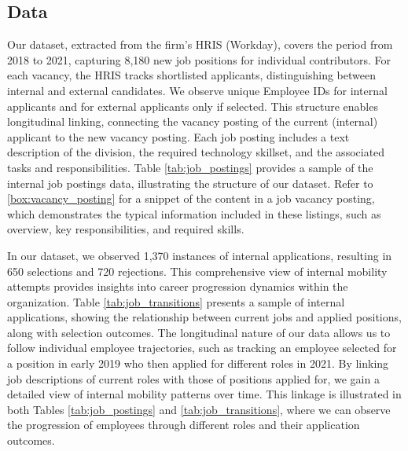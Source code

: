 \subsection{Data}

Our dataset, extracted from the firm's HRIS (Workday), covers the period from 2018 to 2021, capturing 8,180 new job 
positions for individual contributors. For each vacancy, the HRIS tracks shortlisted applicants, distinguishing 
between internal and external candidates. We observe unique Employee IDs for internal applicants and for external 
applicants only if selected. This structure enables longitudinal linking, connecting the vacancy posting of the 
current (internal) applicant to the new vacancy posting. Each job posting includes a text description of the 
division, the required technology skillset, and the associated tasks and responsibilities. 
Table \ref{tab:job_postings} provides a sample of the internal job postings data, illustrating the 
structure of our dataset. Refer to \ref{box:vacancy_posting} for a snippet of the content in a job 
vacancy posting, which demonstrates the typical information included in these listings, such as 
overview, key responsibilities, and required skills.

In our dataset, we observed 1,370 instances of internal applications, resulting in 650 selections and 720 rejections. 
This comprehensive view of internal mobility attempts provides insights into career progression dynamics within 
the organization. Table \ref{tab:job_transitions} presents a sample of internal applications, showing the 
relationship between current jobs and applied positions, along with selection outcomes. The longitudinal 
nature of our data allows us to follow individual employee trajectories, such as tracking an employee selected 
for a position in early 2019 who then applied for different roles in 2021. By linking job descriptions of 
current roles with those of positions applied for, we gain a detailed view of internal mobility patterns over 
time. This linkage is illustrated in both Tables \ref{tab:job_postings} and \ref{tab:job_transitions}, where 
we can observe the progression of employees through different roles and their application outcomes.



